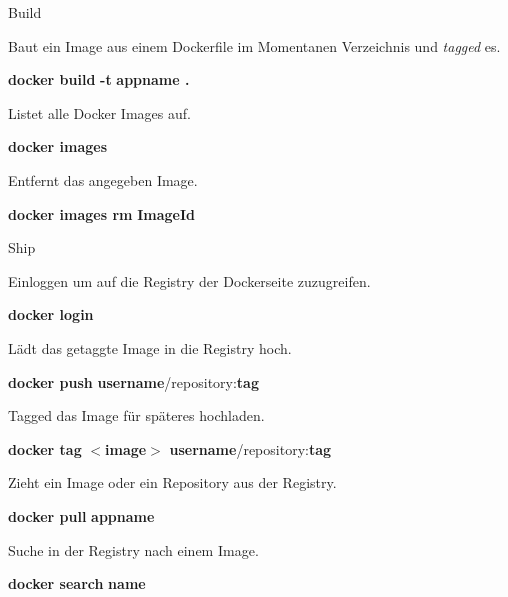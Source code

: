 \documentclass[final]{beamer}
\newlength{\specialcolwid}
\begin{document}
\begin{frame}
\begin{columns}[t]
\begin{column}{\specialcolwid}
\begin{block}{Build}

\par Baut ein Image aus einem Dockerfile im Momentanen Verzeichnis und \textit{tagged} es.

\par \textbf{docker build} \textcolor{docker-pu}{\textbf{-t}} \textcolor{docker-lb}{\textbf{appname .}}

\vspace{1cm}
\par Listet alle Docker Images auf.
\par \textbf{docker images}

\vspace{1cm}
\par Entfernt das angegeben Image.
\par \textbf{docker images rm} \textcolor{docker-lb}{\textbf{ImageId}}

\end{block}

\begin{block}{Ship}

\par Einloggen um auf die Registry der Dockerseite zuzugreifen.
\par \textbf{docker login}

\vspace{1cm}
\par Lädt das getaggte Image in die Registry hoch.
\par \textbf{docker push} \textcolor{docker-lb}{\textbf{username}}/repository:\textcolor{docker-lb}{\textbf{tag}}

\vspace{1cm}
\par Tagged das Image für späteres hochladen.
\par \textbf{docker tag } $<$\textcolor{docker-lb}{\textbf{image}}$>$ \textcolor{docker-lb}{\textbf{username}}/repository:\textcolor{docker-lb}{\textbf{tag}}

\vspace{1cm}
\par Zieht ein Image oder ein Repository aus der Registry.
\par \textbf{docker pull} \textcolor{docker-lb}{\textbf{appname}}

\vspace{1cm}
\par Suche in der Registry nach einem Image.
\par \textbf{docker search} \textcolor{docker-lb}{\textbf{name}}


\end{block}
\end{column}
\end{columns}
\end{frame}
\end{document}
